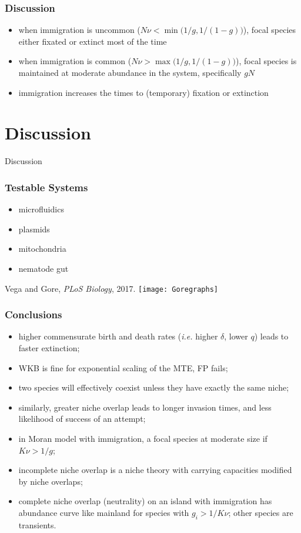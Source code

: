 \documentclass{beamer}
\begin{document}
\begin{frame}
\frametitle{Discussion}
\begin{itemize}
	\item when immigration is uncommon ($N\nu < \min\big(1/g,1/(1-g)\big)$), focal species either fixated or extinct most of the time
	\item when immigration is common ($N\nu > \max\big(1/g,1/(1-g)\big)$), focal species is maintained at moderate abundance in the system, specifically $gN$%
	\pause
	\item immigration increases the times to (temporary) fixation or extinction
\end{itemize}
\end{frame}



\section[Discussion]{Discussion}

\begin{frame}
\centering
{{\Huge Discussion}}
\end{frame}


\begin{frame}
\frametitle{Testable Systems}
\begin{itemize}
	\item microfluidics
	\pause
	\item plasmids
	\pause
	\item mitochondria
	\pause
	\item nematode gut
\end{itemize}
\pause
\centering
Vega and Gore, \emph{PLoS Biology}, 2017.
\texttt{[image: Goregraphs]}
\end{frame}


\begin{frame}
\frametitle{Conclusions}
\begin{itemize}
	\item higher commensurate birth and death rates (\emph{i.e.} higher $\delta$, lower $q$) leads to faster extinction; 
	\pause
	\item WKB is fine for exponential scaling of the MTE, FP fails; 
	\pause
	\item two species will effectively coexist unless they have exactly the same niche; 
	\item similarly, greater niche overlap leads to longer invasion times, and less likelihood of success of an attempt; 
	\pause
	\item in Moran model with immigration, a focal species at moderate size if $K\nu > 1/g$; 
	\pause
	\item incomplete niche overlap is a niche theory with carrying capacities modified by niche overlaps;
	\item complete niche overlap (neutrality) on an island with immigration has abundance curve like mainland for species with $g_i>1/K\nu$; other species are transients. 
\end{itemize}
\end{frame}
\end{document}

